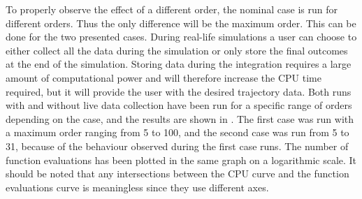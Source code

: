 To properly observe the effect of a different order, the nominal case is run for different orders. Thus the only difference will be the maximum order. This can be done for the two presented cases. During real-life simulations a user can choose to either collect all the data during the simulation or only store the final outcomes at the end of the simulation. Storing data during the integration requires a large amount of computational power and will therefore increase the CPU time required, but it will provide the user with the desired trajectory data. Both runs with and without live data collection have been run for a specific range of orders depending on the case, and the results are shown in .
The first case was run with a maximum order ranging from 5 to 100, and the second case was run from 5 to 31, because of the behaviour observed during the first case runs. The number of function evaluations has been plotted in the same graph on a logarithmic scale. It should be noted that any intersections between the CPU curve and the function evaluations curve is meaningless since they use different axes.



